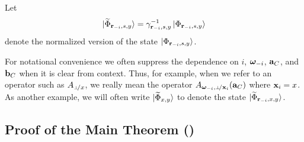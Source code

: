 Let
\begin{equation}\label{eq:def-psitt}
	{|\widetilde{\Phi}_{\mathbf{r}_{-i},s,y}\rangle} = \gamma_{\mathbf{r}_{-i},s,y}^{-1} \, {|\Phi_{\mathbf{r}_{-i},s,y}\rangle}
\end{equation}
denote the normalized version of the state ${|\Phi_{\mathbf{r}_{-i},s,y}\rangle}$.

For notational convenience we often suppress the dependence on $i$, ${\boldsymbol{\omega}}_{-i}$, $\mathbf{a}_C$, and $\mathbf{b}_C$ when it is clear from context. Thus, for example, when we refer to an operator such as $A_\dummyx$, we really mean the operator $A_{\bomega_\mi,\dummy\!/\bx_i}(\ba_C)$ where $\mathbf{x}_i = x$. As another example, we will often write ${|\widetilde{\Phi}_{x,y}\rangle}$ to denote the state ${|\widetilde{\Phi}_{\mathbf{r}_{-i} , x,y}\rangle}$.



%

\subsection{Proof of the Main Theorem ()}


